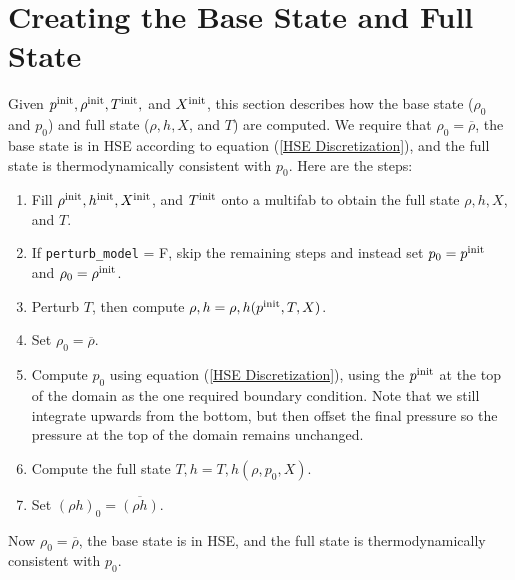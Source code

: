 \section{Creating the Base State and Full State}\label{Sec:Creating the Base State and Full State}

Given $p^{\rm init}, \rho^{\rm init}, T^{\rm init},$ and $X^{\rm init}$, this
section describes how the base state ($\rho_0$ and $p_0$) and full
state ($\rho, h, X$, and $T$) are computed.  We require that $\rho_0 =
\overline\rho$, the base state is in HSE according to equation
(\ref{HSE Discretization}), and the full state is thermodynamically
consistent with $p_0$.  Here are the steps:
\begin{enumerate}
\item Fill $\rho^{\rm init}, h^{\rm init}, X^{\rm init}$, and $T^{\rm init}$ onto a 
  multifab to obtain the full state $\rho, h, X$, and $T$.
\item If {\tt perturb\_model} = F, skip the remaining steps and
  instead set $p_0 = p^{\rm init}$ and $\rho_0 = \rho^{\rm init}$.
\item Perturb $T$, then compute $\rho,h = \rho,h(p^{\rm init},T,X)$.
\item Set $\rho_0 = \overline\rho$.
\item Compute $p_0$ using equation (\ref{HSE Discretization}), using
  the $p^{\rm init}$ at the top of the domain as the one required boundary 
  condition.  Note that we still integrate upwards from the bottom, but then
  offset the final pressure so the pressure at the top of the domain
  remains unchanged.
\item Compute the full state $T,h = T,h(\rho,p_0,X)$.
\item Set $(\rho h)_0 = \overline{(\rho h)}$.
\end{enumerate}
Now $\rho_0 = \overline\rho$, the base state is in HSE, and the full
state is thermodynamically consistent with $p_0$.

